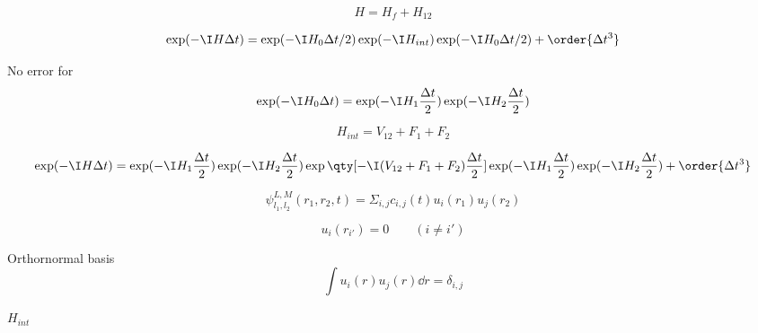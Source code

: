 
\begin{equation}
H = H_f + H_{12}
\end{equation}

\begin{equation}
\exp(-\I H \Delta t) = \exp(-\I H_0 \Delta t/2) \exp(-\I H_{int}) \exp(-\I H_0 \Delta t/2) + \order{\Delta t^3}
\end{equation}

No error for
\begin{equation}
\exp(-\I H_0 \Delta t) = \exp(-\I H_{1} \frac{\Delta t}{2}) \exp(-\I H_2 \frac{\Delta t}{2})
\end{equation}

\begin{equation}
H_{int} = V_{12} + F_1 + F_2
\end{equation}

\begin{equation}
\exp(-\I H\Delta t) = \exp(-\I H_{1} \frac{\Delta t}{2}) \exp(-\I H_2 \frac{\Delta t}{2}) \exp\qty[-\I (V_{12} + F_1 + F_2) \frac{\Delta t}{2}] \exp(-\I H_{1} \frac{\Delta t}{2}) \exp(-\I H_{2} \frac{\Delta t}{2}) + \order{\Delta t^3}
\end{equation}

\begin{equation}
\psi_{l_1,l_2}^{L,M}(r_1, r_2, t) = \Sigma_{i,j} c_{i,j}(t) u_i(r_1) u_j(r_2)
\end{equation}

\begin{equation}
u_i(r_{i'}) = 0 \qquad (i \ne i')
\end{equation}

Orthornormal basis
\begin{equation}
\int u_i(r)u_j(r) \dd{r} = \delta_{i,j}
\end{equation}

$H_{int}$